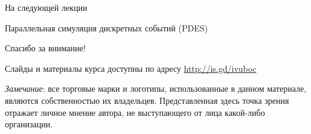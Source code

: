 \documentclass{beamer}
\begin{document}
\begin{frame}{На следующей лекции}
\centering

Параллельная симуляция дискретных событий (PDES)

\end{frame}


\begin{frame}

{\huge{Спасибо за внимание!}\par}

\vfill

Слайды и материалы курса доступны по адресу \url{http://is.gd/ivuboc} %

\vfill

\tiny{\textit{Замечание}: все торговые марки и логотипы, использованные в данном материале, являются собственностью их владельцев. Представленная здесь точка зрения отражает личное мнение автора, не выступающего от лица какой-либо организации.}

\end{frame}
\end{document}
